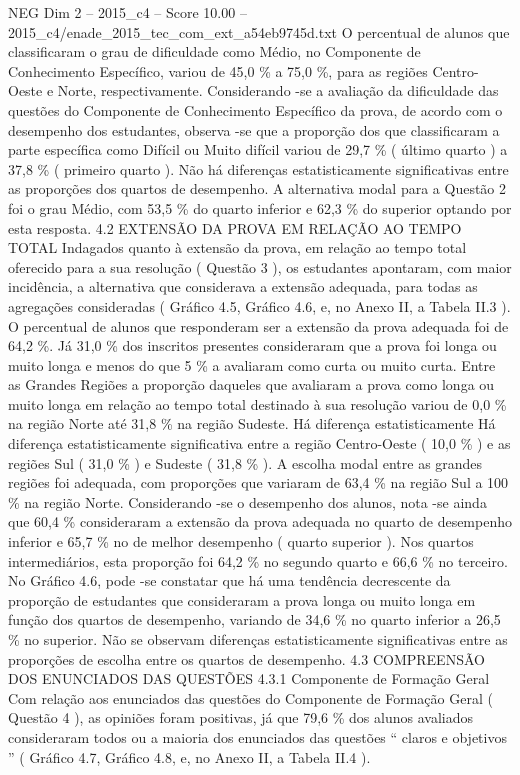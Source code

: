 \begin{textsample}{NEG Dim 2 – 2015\_c4 – Score 10.00 – 2015\_c4/enade\_2015\_tec\_com\_ext\_a54eb9745d.txt}
O percentual de alunos que classificaram o grau de dificuldade como Médio, no Componente de Conhecimento Específico, variou de 45,0 \% a 75,0 \%, para as regiões Centro-Oeste e Norte, respectivamente.
Considerando -se a avaliação da dificuldade das questões do Componente de Conhecimento Específico da prova, de acordo com o desempenho dos estudantes, observa -se que a proporção dos que classificaram a parte específica como Difícil ou Muito difícil variou de 29,7 \% ( último quarto ) a 37,8 \% ( primeiro quarto ).
Não há diferenças estatisticamente significativas entre as proporções dos quartos de desempenho.
A alternativa modal para a Questão 2 foi o grau Médio, com 53,5 \% do quarto inferior e 62,3 \% do superior optando por esta resposta. 4.2 EXTENSÃO DA PROVA EM RELAÇÃO AO TEMPO TOTAL Indagados quanto à extensão da prova, em relação ao tempo total oferecido para a sua resolução ( Questão 3 ), os estudantes apontaram, com maior incidência, a alternativa que considerava a extensão adequada, para todas as agregações consideradas ( Gráfico 4.5, Gráfico 4.6, e, no Anexo II, a Tabela II.3 ).
O percentual de alunos que responderam ser a extensão da prova adequada foi de 64,2 \%.
Já 31,0 \% dos inscritos presentes consideraram que a prova foi longa ou muito longa e menos do que 5 \% a avaliaram como curta ou muito curta.
Entre as Grandes Regiões a proporção daqueles que avaliaram a prova como longa ou muito longa em relação ao tempo total destinado à sua resolução variou de 0,0 \% na região Norte até 31,8 \% na região Sudeste.
Há diferença estatisticamente Há diferença estatisticamente significativa entre a região Centro-Oeste ( 10,0 \% ) e as regiões Sul ( 31,0 \% ) e Sudeste ( 31,8 \% ).
A escolha modal entre as grandes regiões foi adequada, com proporções que variaram de 63,4 \% na região Sul a 100 \% na região Norte.
Considerando -se o desempenho dos alunos, nota -se ainda que 60,4 \% consideraram a extensão da prova adequada no quarto de desempenho inferior e 65,7 \% no de melhor desempenho ( quarto superior ).
Nos quartos intermediários, esta proporção foi 64,2 \% no segundo quarto e 66,6 \% no terceiro.
No Gráfico 4.6, pode -se constatar que há uma tendência decrescente da proporção de estudantes que consideraram a prova longa ou muito longa em função dos quartos de desempenho, variando de 34,6 \% no quarto inferior a 26,5 \% no superior.
Não se observam diferenças estatisticamente significativas entre as proporções de escolha entre os quartos de desempenho. 4.3 COMPREENSÃO DOS ENUNCIADOS DAS QUESTÕES 4.3.1 Componente de Formação Geral Com relação aos enunciados das questões do Componente de Formação Geral ( Questão 4 ), as opiniões foram positivas, já que 79,6 \% dos alunos avaliados consideraram todos ou a maioria dos enunciados das questões “ claros e objetivos ” ( Gráfico 4.7, Gráfico 4.8, e, no Anexo II, a Tabela II.4 ).

\end{textsample}
